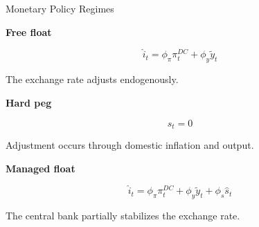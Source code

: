 \documentclass[aspectratio=43, 10pt]{beamer}
\begin{document}
\begin{frame}{Monetary Policy Regimes}

\small


\vspace{10pt}

\textbf{Free float}

\[
\hat i_t
=
\phi_\pi\pi_t^{DC}+\phi_y\tilde y_t
\]

The exchange rate adjusts endogenously.

\vspace{10pt}

\textbf{Hard peg}

\[
\hat s_t=0
\]

Adjustment occurs through domestic inflation and output.

\vspace{10pt}

\textbf{Managed float}

\[
\hat i_t
=
\phi_\pi\pi_t^{DC}+\phi_y\tilde y_t+\phi_s\hat s_t
\]

The central bank partially stabilizes the exchange rate.

\end{frame}
\end{document}
